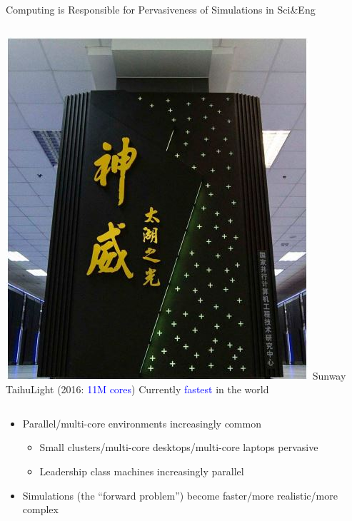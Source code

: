 \documentclass[handout,aspectratio=54]{beamer}
\numberwithin{theorem}{section}
\begin{document}
\begin{frame}{Computing is Responsible for Pervasiveness of Simulations in Sci\&Eng}
\begin{columns}
\includegraphics[width=\textwidth]{fig/3-3.jpg}
{
\scriptsize
Sunway TaihuLight (2016: \textcolor{blue}{11M cores})
Currently \textcolor{blue}{fastest} in the world
}
\end{columns}

\begin{itemize}
\item  Parallel/multi-core environments increasingly common
\begin{itemize}
\item Small clusters/multi-core desktops/multi-core laptops pervasive
\item Leadership class machines increasingly parallel
\end{itemize}

\item Simulations (the “forward problem”) become faster/more realistic/more complex
\end{itemize}
\end{frame}
\end{document}
